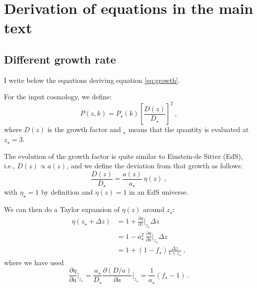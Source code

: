 \section{Derivation of equations in the main text} \label{app:eq}


\subsection{Different growth rate}

I write below the equations deriving equation \ref{eq:growth}.

For the input cosmology, we define:
\begin{equation}
 P(z,k) = P_\star(k) \left[ \frac{D(z)}{D_\star} \right]^2 ~,
\end{equation}
where $D(z)$ is the growth factor and $_\star$ means that the quantity is 
evaluated at $z_\star=3$. 

The evolution of the growth factor is quite similar to Einstein-de Sitter 
(EdS), i.e., $D(z) \propto a(z)$, and we define the deviation from that growth 
as follows:
\begin{equation}
 \frac{D(z)}{D_\star} = \frac{a(z)}{a_\star} ~ \eta(z) ~,
\end{equation}
with $\eta_\star=1$ by definition and $\eta(z)=1$ in an EdS universe.

We can then do a Taylor expansion of $\eta(z)$ around $z_\star$:
\begin{align}
 \eta(z_\star+\Delta z) 
  & = 1 + \frac{\partial \eta}{\partial z} 
      \Bigr\rvert_{z_\star} \Delta z                    \nonumber \\
  & = 1 - a_\star^2~\frac{\partial \eta}{\partial a} 
      \Bigr\rvert_{z_\star} \Delta z                    \nonumber \\
  & = 1 + \left( 1 - f_\star \right) \frac{\Delta z}{1+z_\star} ~,
\end{align}
where we have used 
\begin{equation}
 \frac{\partial \eta}{\partial a} \Bigr\rvert_{z_\star} 
  = \frac{a_\star}{D_\star} \frac{\partial (D/a)}{\partial a} 
    \Bigr\rvert_{z_\star}
  = \frac{1}{a_\star} \left( f_\star - 1 \right) ~.
\end{equation}

